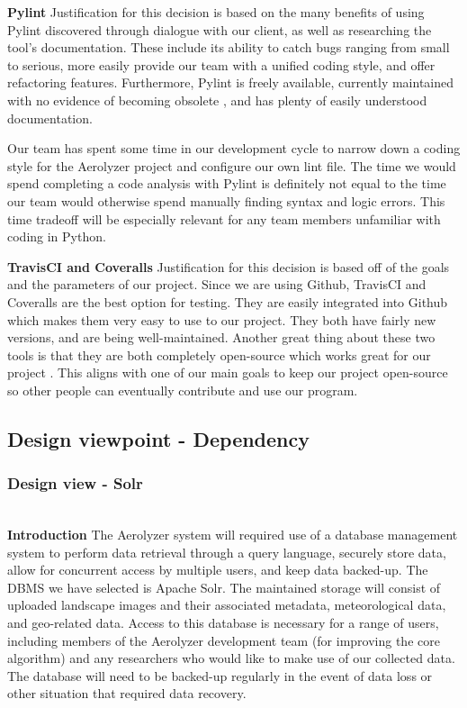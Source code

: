 \documentclass[onecolumn, draftclsnofoot,10pt, compsoc]{IEEEtran}
\begin{document}
\begin{flushleft}
\medskip

\textbf{Pylint } Justification for this decision is based on the many benefits of using Pylint discovered through dialogue with our client, as well as researching the tool's documentation. These include its ability to catch bugs ranging from small to serious, more easily provide our team with a unified coding style, and offer refactoring features. Furthermore, Pylint is freely available, currently maintained with no evidence of becoming obsolete \cite{20}, and has plenty of easily understood documentation. \cite{6} 

\medskip

Our team has spent some time in our development cycle to narrow down a coding style for the Aerolyzer project and configure our own lint file. The time we would spend completing a code analysis with Pylint is definitely not equal to the time our team would otherwise spend manually finding syntax and logic errors. This time tradeoff will be especially relevant for any team members unfamiliar with coding in Python.

\medskip

\textbf{TravisCI and Coveralls} Justification for this decision is based off of the goals and the parameters of our project. Since we are using Github, TravisCI and Coveralls are the best option for testing. They are easily integrated into Github which makes them very easy to use to our project. They both have fairly new versions, and are being well-maintained. Another great thing about these two tools is that they are both completely open-source which works great for our project \cite{15}. This aligns with one of our main goals to keep our project open-source so other people can eventually contribute and use our program.

\bigskip

\subsection{Design viewpoint - Dependency}
\subsubsection{Design view - Solr} \ \\
\textbf{Introduction} The Aerolyzer system will required use of a database management system to perform data retrieval through a query language, securely store data, allow for concurrent access by multiple users, and keep data backed-up. The DBMS we have selected is Apache Solr. The maintained storage will consist of uploaded landscape images and their associated metadata, meteorological data, and geo-related data. Access to this database is necessary for a range of users, including members of the Aerolyzer development team (for improving the core algorithm) and any researchers who would like to make use of our collected data. The database will need to be backed-up regularly in the event of data loss or other situation that required data recovery.


\end{flushleft}
\end{document}
